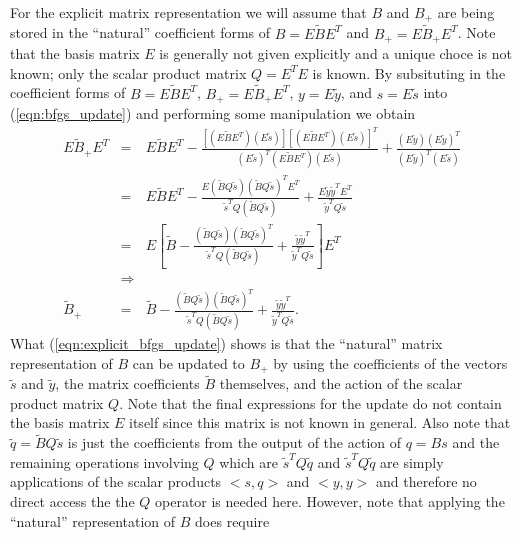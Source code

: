 For the explicit matrix representation we will assume that $B$ and $B_+$ are
being stored in the ``natural'' coefficient forms of $B = E {}\tilde{B} E^T$
and $B_+ = E {}\tilde{B}_+ E^T$.  Note that the basis matrix $E$ is generally
not given explicitly and a unique choce is not known; only the scalar product
matrix $Q = E^T E$ is known.  By subsituting in the coefficient forms of $B =
E {}\tilde{B} E^T$, $B_+ = E {}\tilde{B}_+ E^T$, $y = E {}\tilde{y}$, and $s =
E {}\tilde{s}$ into (\ref{eqn:bfgs_update}) and performing some manipulation
we obtain
%
\begin{eqnarray}
E \tilde{B}_+ E^T
& = & E \tilde{B} E^T
  - \frac{[(E \tilde{B} E^T)(E \tilde{s})][(E \tilde{B} E^T)(E \tilde{s})]^T}{(E \tilde{s})^T(E \tilde{B} E^T)(E \tilde{s})}
  + \frac{(E \tilde{y})(E \tilde{y})^T}{(E \tilde{y})^T (E \tilde{s})} \nonumber \\
& = & E \tilde{B} E^T
  - \frac{E(\tilde{B} Q \tilde{s})(\tilde{B} Q \tilde{s})^T E^T}{\tilde{s}^T Q (\tilde{B} Q \tilde{s})}
  + \frac{E \tilde{y} \tilde{y}^T E^T}{\tilde{y}^T Q \tilde{s}} \nonumber \\
& = & E \left[
  \tilde{B}
  - \frac{(\tilde{B} Q \tilde{s})(\tilde{B} Q \tilde{s})^T}{\tilde{s}^T Q (\tilde{B} Q \tilde{s})}
  + \frac{\tilde{y} \tilde{y}^T}{\tilde{y}^T Q \tilde{s}}
  \right] E^T \nonumber \\
& \Rightarrow & \nonumber \\
\tilde{B}_+
& = & \tilde{B}
  - \frac{(\tilde{B} Q \tilde{s})(\tilde{B} Q \tilde{s})^T}{\tilde{s}^T Q (\tilde{B} Q \tilde{s})}
  + \frac{\tilde{y} \tilde{y}^T}{\tilde{y}^T Q \tilde{s}}.
\label{eqn:explicit_bfgs_update}
\end{eqnarray}
%
What (\ref{eqn:explicit_bfgs_update}) shows is that the ``natural'' matrix
representation of $B$ can be updated to $B_+$ by using the coefficients of the
vectors $\tilde{s}$ and $\tilde{y}$, the matrix coefficients $\tilde{B}$
themselves, and the action of the scalar product matrix $Q$.  Note that the
final expressions for the update do not contain the basis matrix $E$ itself
since this matrix is not known in general.  Also note that $\tilde{q} =
{}\tilde{B}Q\tilde{s}$ is just the coefficients from the output of the action
of $q = B s$ and the remaining operations involving $Q$ which are $\tilde{s}^T
Q\tilde{q}$ and $\tilde{s}^T Q\tilde{q}$ are simply applications of the scalar
products $<s,q>$ and $<y,y>$ and therefore no direct access the the $Q$
operator is needed here.  However, note that applying the ``natural''
representation of $B$ does require


